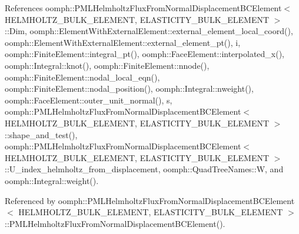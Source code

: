 References oomph\+::\+P\+M\+L\+Helmholtz\+Flux\+From\+Normal\+Displacement\+B\+C\+Element$<$ H\+E\+L\+M\+H\+O\+L\+T\+Z\+\_\+\+B\+U\+L\+K\+\_\+\+E\+L\+E\+M\+E\+N\+T, E\+L\+A\+S\+T\+I\+C\+I\+T\+Y\+\_\+\+B\+U\+L\+K\+\_\+\+E\+L\+E\+M\+E\+N\+T $>$\+::\+Dim, oomph\+::\+Element\+With\+External\+Element\+::external\+\_\+element\+\_\+local\+\_\+coord(), oomph\+::\+Element\+With\+External\+Element\+::external\+\_\+element\+\_\+pt(), i, oomph\+::\+Finite\+Element\+::integral\+\_\+pt(), oomph\+::\+Face\+Element\+::interpolated\+\_\+x(), oomph\+::\+Integral\+::knot(), oomph\+::\+Finite\+Element\+::nnode(), oomph\+::\+Finite\+Element\+::nodal\+\_\+local\+\_\+eqn(), oomph\+::\+Finite\+Element\+::nodal\+\_\+position(), oomph\+::\+Integral\+::nweight(), oomph\+::\+Face\+Element\+::outer\+\_\+unit\+\_\+normal(), s, oomph\+::\+P\+M\+L\+Helmholtz\+Flux\+From\+Normal\+Displacement\+B\+C\+Element$<$ H\+E\+L\+M\+H\+O\+L\+T\+Z\+\_\+\+B\+U\+L\+K\+\_\+\+E\+L\+E\+M\+E\+N\+T, E\+L\+A\+S\+T\+I\+C\+I\+T\+Y\+\_\+\+B\+U\+L\+K\+\_\+\+E\+L\+E\+M\+E\+N\+T $>$\+::shape\+\_\+and\+\_\+test(), oomph\+::\+P\+M\+L\+Helmholtz\+Flux\+From\+Normal\+Displacement\+B\+C\+Element$<$ H\+E\+L\+M\+H\+O\+L\+T\+Z\+\_\+\+B\+U\+L\+K\+\_\+\+E\+L\+E\+M\+E\+N\+T, E\+L\+A\+S\+T\+I\+C\+I\+T\+Y\+\_\+\+B\+U\+L\+K\+\_\+\+E\+L\+E\+M\+E\+N\+T $>$\+::\+U\+\_\+index\+\_\+helmholtz\+\_\+from\+\_\+displacement, oomph\+::\+Quad\+Tree\+Names\+::W, and oomph\+::\+Integral\+::weight().



Referenced by oomph\+::\+P\+M\+L\+Helmholtz\+Flux\+From\+Normal\+Displacement\+B\+C\+Element$<$ H\+E\+L\+M\+H\+O\+L\+T\+Z\+\_\+\+B\+U\+L\+K\+\_\+\+E\+L\+E\+M\+E\+N\+T, E\+L\+A\+S\+T\+I\+C\+I\+T\+Y\+\_\+\+B\+U\+L\+K\+\_\+\+E\+L\+E\+M\+E\+N\+T $>$\+::\+P\+M\+L\+Helmholtz\+Flux\+From\+Normal\+Displacement\+B\+C\+Element().

\mbox{\label{classoomph_1_1PMLHelmholtzFluxFromNormalDisplacementBCElement_a64c0556634eed3070ae9a63d2a43efb5}} 
